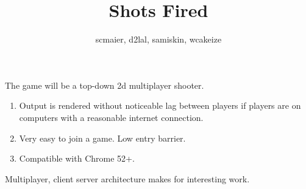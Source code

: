 \documentclass{slides}
\title{Shots Fired}
\author{scmaier, d2lal, samiskin, wcakeize}
\begin{document}
\maketitle
The game will be a top-down 2d multiplayer shooter.
\clearpage


\begin{enumerate}
\item Output is rendered without noticeable lag between players if players are on computers with a reasonable internet connection. 
\item Very easy to join a game. Low entry barrier. 
\item Compatible with Chrome 52+.
\end{enumerate}

\clearpage

Multiplayer, client server architecture makes for interesting work.

\clearpage
\end{document}
